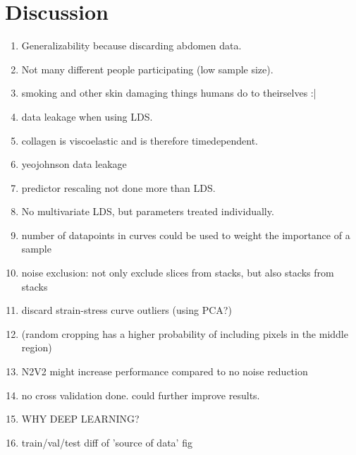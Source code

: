 \chapter{Discussion}

\begin{enumerate}
    \item Generalizability because discarding abdomen data.
    \item Not many different people participating (low sample size).
    \item smoking and other skin damaging things humans do to theirselves :|
    \item data leakage when using LDS.
    \item collagen is viscoelastic and is therefore timedependent.
    \item yeojohnson data leakage
    \item predictor rescaling not done more than LDS.
    \item No multivariate LDS, but parameters treated individually.
    \item number of datapoints in curves could be used to weight the importance of a sample
    \item noise exclusion: not only exclude slices from stacks, but also stacks from stacks
    \item discard strain-stress curve outliers (using PCA?)
    \item (random cropping has a higher probability of including pixels in the middle region)
    \item N2V2 might increase performance compared to no noise reduction
    \item no cross validation done. could further improve results.
    \item WHY DEEP LEARNING?
    \item train/val/test diff of 'source of data' fig
\end{enumerate}